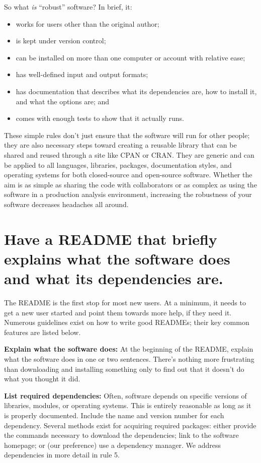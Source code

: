 \documentclass[10pt,letterpaper]{article}
\begin{document}
So what \emph{is} ``robust'' software?
In brief, it:

\begin{itemize}
\item
  works for users other than the original author;
\item
  is kept under version control;
\item
  can be installed on more than one computer or account with relative ease;
\item
  has well-defined input and output formats;
\item
  has documentation that describes what its dependencies are, how to
  install it, and what the options are; and
\item
  comes with enough tests to show that it actually runs.
\end{itemize}

These simple rules don't just ensure that the software will run for other people;
they are also necessary steps toward creating a reusable
library that can be shared and reused through a site like CPAN or CRAN.  They are
generic and can be applied to all languages, libraries, packages,
documentation styles, and operating systems for both closed-source and
open-source software.  
Whether the aim is as simple as sharing the
code with collaborators or as complex as using the software in a
production analysis environment, increasing the robustness of your
software decreases headaches all around.

\section{Have a README that briefly explains what the software does and what its dependencies are.}

The README is the first stop for most new users.
At a minimum, it needs to get a new user started and point them towards more
help, if they need it. 
Numerous guidelines exist on how to write good
READMEs\cite{Johnson1997,gnustandards};
their key common features are listed below.

\textbf{Explain what the software does:} At the beginning of the README,
explain what the software does in one or two sentences.
There's nothing more frustrating
than downloading and installing something only to
find out that it doesn't do what you thought it did.

\textbf{List required dependencies:} Often, software depends on
specific versions of libraries, modules, or operating systems. 
This is
entirely reasonable as long as it is properly documented. Include the name and
version number for each dependency.  Several methods exist for acquiring
required packages: either provide the commands necessary to download the
dependencies; link to the software homepage; or (our preference) use a
dependency manager. We address dependencies in more detail in rule 5.
\end{document}
